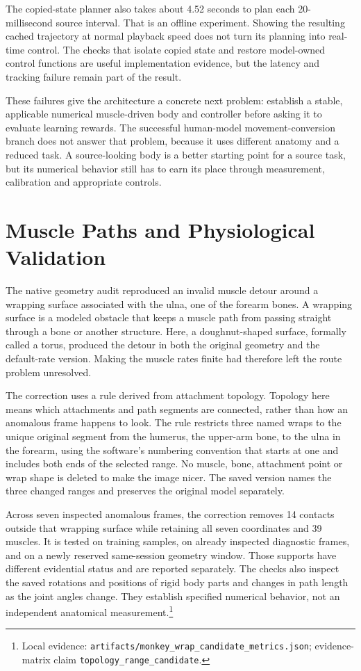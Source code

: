 The copied-state planner also takes about 4.52 seconds to plan each 20-millisecond source interval. That is an offline experiment. Showing the resulting cached trajectory at normal playback speed does not turn its planning into real-time control. The checks that isolate copied state and restore model-owned control functions are useful implementation evidence, but the latency and tracking failure remain part of the result.

These failures give the architecture a concrete next problem: establish a stable, applicable numerical muscle-driven body and controller before asking it to evaluate learning rewards. The successful human-model movement-conversion branch does not answer that problem, because it uses different anatomy and a reduced task. A source-looking body is a better starting point for a source task, but its numerical behavior still has to earn its place through measurement, calibration and appropriate controls.

\section{Muscle Paths and Physiological Validation}

The native geometry audit reproduced an invalid muscle detour around a wrapping surface associated with the ulna, one of the forearm bones. A wrapping surface is a modeled obstacle that keeps a muscle path from passing straight through a bone or another structure. Here, a doughnut-shaped surface, formally called a torus, produced the detour in both the original geometry and the default-rate version. Making the muscle rates finite had therefore left the route problem unresolved.

The correction uses a rule derived from attachment topology. Topology here means which attachments and path segments are connected, rather than how an anomalous frame happens to look. The rule restricts three named wraps to the unique original segment from the humerus, the upper-arm bone, to the ulna in the forearm, using the software's numbering convention that starts at one and includes both ends of the selected range. No muscle, bone, attachment point or wrap shape is deleted to make the image nicer. The saved version names the three changed ranges and preserves the original model separately.\cite{limblabmodel2026,opensim2018}

Across seven inspected anomalous frames, the correction removes 14 contacts outside that wrapping surface while retaining all seven coordinates and 39 muscles. It is tested on training samples, on already inspected diagnostic frames, and on a newly reserved same-session geometry window. Those supports have different evidential status and are reported separately. The checks also inspect the saved rotations and positions of rigid body parts and changes in path length as the joint angles change. They establish specified numerical behavior, not an independent anatomical measurement.\footnote{Local evidence: \texttt{artifacts/monkey\_wrap\_candidate\_metrics.json}; evidence-matrix claim \texttt{\mbox{topology}\_\allowbreak{}\mbox{range}\_\allowbreak{}\mbox{candidate}}.}


